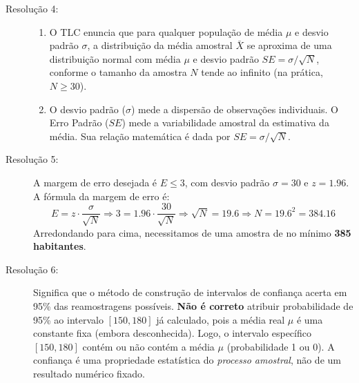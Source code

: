 \documentclass[12pt]{article}
\begin{document}
\begin{description}
    \item[Resolução 4:] 
    \begin{enumerate}[label=\alph*)]
        \item O TLC enuncia que para qualquer população de média $\mu$ e desvio padrão $\sigma$, a distribuição da média amostral $\bar{X}$ se aproxima de uma distribuição normal com média $\mu$ e desvio padrão $SE = \sigma/\sqrt{N}$, conforme o tamanho da amostra $N$ tende ao infinito (na prática, $N \geq 30$).
        \item O desvio padrão ($\sigma$) mede a dispersão de observações individuais. O Erro Padrão ($SE$) mede a variabilidade amostral da estimativa da média. Sua relação matemática é dada por $SE = \sigma / \sqrt{N}$.
    \end{enumerate}

    \item[Resolução 5:] A margem de erro desejada é $E \le 3$, com desvio padrão $\sigma = 30$ e $z = 1.96$. A fórmula da margem de erro é:
    $$E = z \cdot \frac{\sigma}{\sqrt{N}} \Rightarrow 3 = 1.96 \cdot \frac{30}{\sqrt{N}} \Rightarrow \sqrt{N} = 19.6 \Rightarrow N = 19.6^2 = 384.16$$
    Arredondando para cima, necessitamos de uma amostra de no mínimo \textbf{385 habitantes}.

    \item[Resolução 6:] Significa que o método de construção de intervalos de confiança acerta em 95\% das reamostragens possíveis. \textbf{Não é correto} atribuir probabilidade de 95\% ao intervalo $[150, 180]$ já calculado, pois a média real $\mu$ é uma constante fixa (embora desconhecida). Logo, o intervalo específico $[150, 180]$ contém ou não contém a média $\mu$ (probabilidade 1 ou 0). A confiança é uma propriedade estatística do \textit{processo amostral}, não de um resultado numérico fixado.
\end{description}
\end{document}
